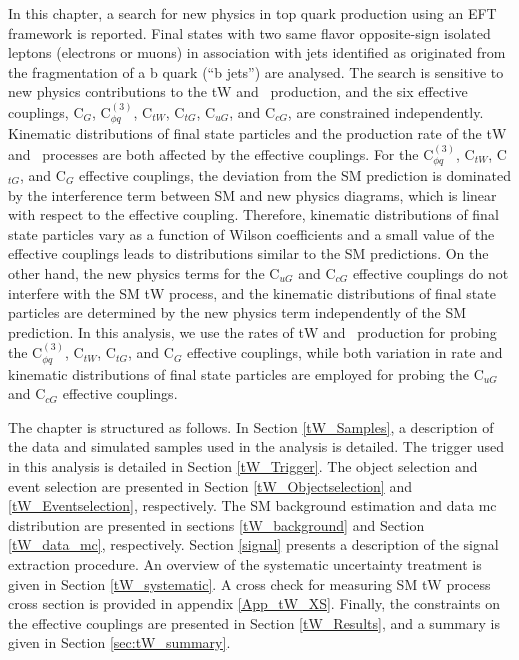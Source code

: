 In this chapter, a search for new physics in top quark production using an EFT framework is reported. Final states with two same flavor opposite-sign isolated leptons (electrons or muons) in association with jets identified as originated from the fragmentation of a b quark (``b jets'') are analysed.
The search is sensitive to new physics contributions to the tW and \ttbar ~production, and the six effective couplings, C$_{G}$, C$_{\phi q}^{(3)}$, C$_{tW}$, C$_{tG}$, C$_{uG}$, and C$_{cG}$, are constrained independently.
Kinematic distributions of final state particles and the production rate of the tW and \ttbar ~processes are both affected by the effective couplings. For the C$_{\phi q}^{(3)}$, C$_{tW}$, C$_{tG}$, and C$_{G}$ effective couplings, the deviation from the SM prediction is dominated by the interference term between SM and new physics diagrams, which is linear with respect to the effective coupling. Therefore, kinematic distributions of final state particles vary as a function of Wilson coefficients and a small value of the effective couplings leads to distributions similar to the SM predictions.
On the other hand, the new physics terms for the C$_{uG}$ and C$_{cG}$ effective couplings do not interfere with the SM tW process, and the kinematic distributions of final state particles are determined by the new physics term independently of the SM prediction.
In this analysis, we use the rates of tW and \ttbar ~production for probing the C$_{\phi q}^{(3)}$, C$_{tW}$, C$_{tG}$, and C$_{G}$ effective couplings, while both variation in rate and kinematic distributions of final state particles are employed  for probing the C$_{uG}$ and C$_{cG}$ effective couplings.



The chapter is structured as follows. In Section \ref{tW_Samples}, a description of the data and simulated samples used in the analysis is detailed. The trigger used in this analysis is detailed in Section \ref{tW_Trigger}. The object selection and event selection are presented in Section \ref{tW_Objectselection} and \ref{tW_Eventselection}, respectively. The SM background estimation and data mc distribution are presented in sections \ref{tW_background} and Section \ref{tW_data_mc}, respectively.
Section \ref{signal} presents a description of the signal extraction procedure.
An overview of the systematic uncertainty treatment is given in Section \ref{tW_systematic}. A cross check for measuring SM tW process cross section is provided in appendix \ref{App_tW_XS}.
Finally, the constraints on the effective couplings are presented in Section \ref{tW_Results}, and a summary is given in Section \ref{sec:tW_summary}.
